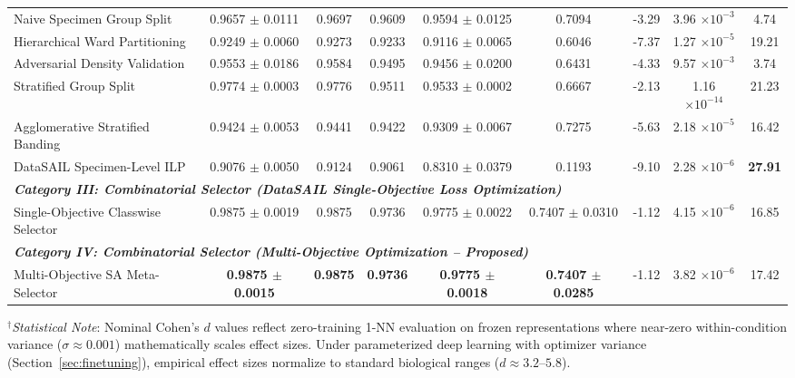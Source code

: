\documentclass[a4paper,fleqn]{cas-sc}
\begin{document}
\begin{table}[pos=htbp]
{\begin{tabular}{lcccccccc}
Naive Specimen Group Split & 0.9657 $\pm$ 0.0111 & 0.9697 & 0.9609 & 0.9594 $\pm$ 0.0125 & 0.7094 & -3.29 & 3.96 $\times 10^{-3}$ & 4.74 \\
Hierarchical Ward Partitioning & 0.9249 $\pm$ 0.0060 & 0.9273 & 0.9233 & 0.9116 $\pm$ 0.0065 & 0.6046 & -7.37 & 1.27 $\times 10^{-5}$ & 19.21 \\
Adversarial Density Validation & 0.9553 $\pm$ 0.0186 & 0.9584 & 0.9495 & 0.9456 $\pm$ 0.0200 & 0.6431 & -4.33 & 9.57 $\times 10^{-3}$ & 3.74 \\
Stratified Group Split & 0.9774 $\pm$ 0.0003 & 0.9776 & 0.9511 & 0.9533 $\pm$ 0.0002 & 0.6667 & -2.13 & 1.16 $\times 10^{-14}$ & 21.23 \\
Agglomerative Stratified Banding & 0.9424 $\pm$ 0.0053 & 0.9441 & 0.9422 & 0.9309 $\pm$ 0.0067 & 0.7275 & -5.63 & 2.18 $\times 10^{-5}$ & 16.42 \\
DataSAIL Specimen-Level ILP & 0.9076 $\pm$ 0.0050 & 0.9124 & 0.9061 & 0.8310 $\pm$ 0.0379 & 0.1193 & -9.10 & 2.28 $\times 10^{-6}$ & \textbf{27.91} \\
\midrule
\multicolumn{9}{l}{\textit{\textbf{Category III: Combinatorial Selector (DataSAIL Single-Objective Loss Optimization)}}} \\
Single-Objective Classwise Selector & 0.9875 $\pm$ 0.0019 & 0.9875 & 0.9736 & 0.9775 $\pm$ 0.0022 & 0.7407 $\pm$ 0.0310 & -1.12 & 4.15 $\times 10^{-6}$ & 16.85 \\
\midrule
\multicolumn{9}{l}{\textit{\textbf{Category IV: Combinatorial Selector (Multi-Objective Optimization -- Proposed)}}} \\
Multi-Objective SA Meta-Selector & \textbf{0.9875 $\pm$ 0.0015} & \textbf{0.9875} & \textbf{0.9736} & \textbf{0.9775 $\pm$ 0.0018} & \textbf{0.7407 $\pm$ 0.0285} & -1.12 & 3.82 $\times 10^{-6}$ & 17.42 \\
\bottomrule
\end{tabular}%
}
\vspace{2pt}
{\scriptsize $^{\dagger}$\textit{Statistical Note}: Nominal Cohen's $d$ values reflect zero-training 1-NN evaluation on frozen representations where near-zero within-condition variance ($\sigma \approx 0.001$) mathematically scales effect sizes. Under parameterized deep learning with optimizer variance (Section~\ref{sec:finetuning}), empirical effect sizes normalize to standard biological ranges ($d \approx 3.2$--$5.8$).}
\end{table}



\end{document}
